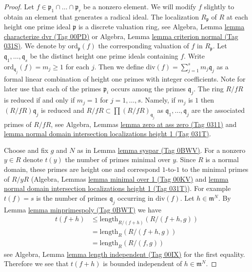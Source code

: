 \documentclass{amsart}
\theoremstyle{plain}
\theoremstyle{definition}
\theoremstyle{remark}
\numberwithin{equation}{subsection}
\begin{document}
\begin{proof}
Let $f \in \mathfrak p_1 \cap \ldots \cap \mathfrak p_r$ be a nonzero element.
We will modify $f$ slightly to obtain an element that generates a radical ideal.
The localization $R_\mathfrak p$ of $R$ at each height one prime
ideal $\mathfrak p$ is a discrete valuation ring, see
Algebra, Lemma \href{https://stacks.math.columbia.edu/tag/00PD}{lemma characterize dvr (Tag 00PD)} or
Algebra, Lemma \href{https://stacks.math.columbia.edu/tag/031S}{lemma criterion normal (Tag 031S)}.
We denote by $\text{ord}_\mathfrak p(f)$ the corresponding
valuation of $f$ in $R_{\mathfrak p}$. Let
$\mathfrak q_1, \ldots, \mathfrak q_s$
be the distinct height one prime ideals containing $f$.
Write $\text{ord}_{\mathfrak q_j}(f) = m_j \geq 1$ for each $j$.
Then we define $\text{div}(f) = \sum_{j = 1}^s m_j\mathfrak q_j$
as a formal linear combination of
height one primes with integer coefficients.
Note for later use that each of the primes $\mathfrak p_i$
occurs among the primes $\mathfrak q_j$.
The ring $R/fR$ is reduced if and only if
$m_j = 1$ for $j = 1, \ldots, s$. Namely, if $m_j$ is $1$ then
$(R/fR)\mathfrak q_j$ is reduced and
$R/fR \subset \prod (R/fR)_{\mathfrak q_j}$ as
$\mathfrak q_1, \ldots, \mathfrak q_j$ are the associated primes
of $R/fR$, see Algebra, Lemmas
\href{https://stacks.math.columbia.edu/tag/0311}{lemma zero at ass zero (Tag 0311)} and
\href{https://stacks.math.columbia.edu/tag/031T}{lemma normal domain intersection localizations height 1 (Tag 031T)}.

\medskip\noindent
Choose and fix $g$ and $N$ as in Lemma \href{https://stacks.math.columbia.edu/tag/0BWV}{lemma syspar (Tag 0BWV)}.
For a nonzero $y \in R$ denote $t(y)$ the number of primes minimal over $y$.
Since $R$ is a normal domain, these primes
are height one and correspond $1$-to-$1$ to the minimal primes of
$R/yR$ (Algebra, Lemmas \href{https://stacks.math.columbia.edu/tag/00KV}{lemma minimal over 1 (Tag 00KV)} and
\href{https://stacks.math.columbia.edu/tag/031T}{lemma normal domain intersection localizations height 1 (Tag 031T)}).
For example $t(f) = s$ is the number
of primes $\mathfrak q_j$ occurring in $\text{div}(f)$.
Let $h \in \mathfrak m^N$. By Lemma \href{https://stacks.math.columbia.edu/tag/0BWT}{lemma minprimespoly (Tag 0BWT)} we have
\begin{align*}
t(f + h) & \leq \text{length}_{R/(f + h)}(R/(f + h, g)) \\
& = \text{length}_R(R/(f + h, g)) \\
& = \text{length}_R(R/(f, g))
\end{align*}
see Algebra, Lemma \href{https://stacks.math.columbia.edu/tag/00IX}{lemma length independent (Tag 00IX)}
for the first equality.
Therefore we see that $t(f + h)$ is bounded independent of
$h \in \mathfrak m^N$.


\end{proof}
\end{document}
